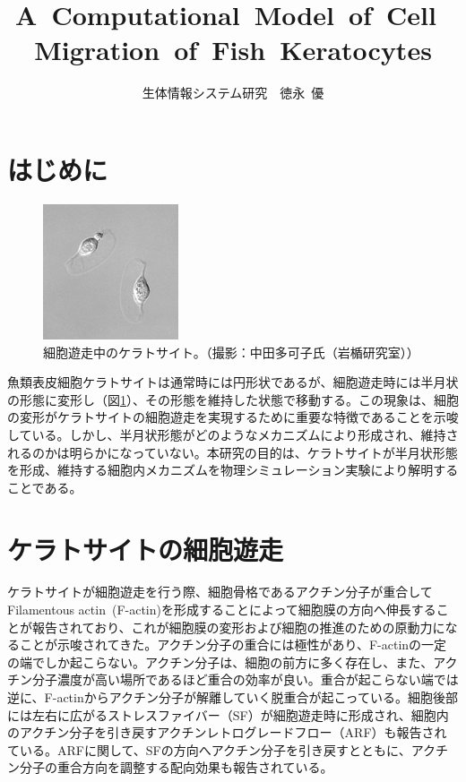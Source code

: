 \documentclass[10pt,twocolumn,a4j]{jarticle}
\title{A~Computational~Model~of~Cell~Migration~of~Fish~Keratocytes}
\author{生体情報システム研究~~徳永~優}
\date{}
\begin{document}
\maketitle
\section{はじめに}
\begin{figure}[tbp]
\centering
\includegraphics[width=4cm]{kera.eps}
\caption{細胞遊走中のケラトサイト。（撮影：中田多可子氏（岩楯研究室））}
\label{fig:kera}
\end{figure}
魚類表皮細胞ケラトサイトは通常時には円形状であるが、細胞遊走時には半月状の形態に変形し（図\ref{fig:kera}）、その形態を維持した状態で移動する。この現象は、細胞の変形がケラトサイトの細胞遊走を実現するために重要な特徴であることを示唆している。しかし、半月状形態がどのようなメカニズムにより形成され、維持されるのかは明らかになっていない。本研究の目的は、ケラトサイトが半月状形態を形成、維持する細胞内メカニズムを物理シミュレーション実験により解明することである。
\section{ケラトサイトの細胞遊走}
ケラトサイトが細胞遊走を行う際、細胞骨格であるアクチン分子が重合してFilamentous actin~(F-actin)を形成することによって細胞膜の方向へ伸長することが報告されており、これが細胞膜の変形および細胞の推進のための原動力になることが示唆されてきた\cite{svitkina1997analysis}。アクチン分子の重合には極性があり、F-actinの一定の端でしか起こらない。アクチン分子は、細胞の前方に多く存在し、また、アクチン分子濃度が高い場所であるほど重合の効率が良い\cite{yumura1998spatiotemporal}。重合が起こらない端では逆に、F-actinからアクチン分子が解離していく脱重合が起こっている。細胞後部には左右に広がるストレスファイバー（SF）が細胞遊走時に形成され、細胞内のアクチン分子を引き戻すアクチンレトログレードフロー（ARF）も報告されている\cite{nakashima2015molecular}。ARFに関して、SFの方向へアクチン分子を引き戻すとともに、アクチン分子の重合方向を調整する配向効果も報告されている\cite{swaminathan2017actin}。
\end{document}
